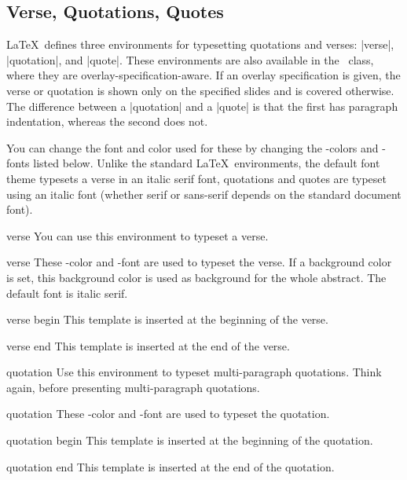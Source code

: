 \subsection{Verse, Quotations, Quotes}

\LaTeX\ defines three environments for typesetting quotations and
verses: |verse|, |quotation|, and |quote|. These environments are also
available in the \beamer\ class, where they are
overlay-specification-aware. If an overlay specification is given, the
verse or quotation is shown only on the specified slides and is
covered otherwise. The difference between a |quotation| and a |quote|
is that the first has paragraph indentation, whereas the second does
not. 

You can change the font and color used for these by changing the
\beamer-colors and -fonts listed below. Unlike the standard \LaTeX\
environments, the default font theme typesets a verse in an italic
serif font, quotations and quotes are typeset using an italic font
(whether serif or sans-serif depends on the standard document font).


\begin{environment}{{verse}}
  You can use this environment to typeset a verse.

  \begin{element}{verse}\no\yes\yes
    These \beamer-color and -font are used to typeset the verse. If
    a background color is set, this background color is used as
    background for the whole abstract. The default font is italic
    serif. 
  \end{element}

  \begin{element}{verse begin}\yes\no\no
    This template is inserted at the beginning of the verse.
  \end{element}

  \begin{element}{verse end}\yes\no\no
    This template is inserted at the end of the verse.
  \end{element}
\end{environment}


\begin{environment}{{quotation}\sarg{action specification}}
  Use this environment to typeset multi-paragraph quotations. Think
  again, before presenting multi-paragraph quotations.

  \begin{element}{quotation}\no\yes\yes
    These \beamer-color and -font are used to typeset the quotation.
  \end{element}

  \begin{element}{quotation begin}\yes\no\no
    This template is inserted at the beginning of the quotation.
  \end{element}

  \begin{element}{quotation end}\yes\no\no
    This template is inserted at the end of the quotation.
  \end{element}
\end{environment}



